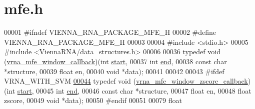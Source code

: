 \hypertarget{mfe_8h_source}{}\section{mfe.\+h}
\label{mfe_8h_source}

\begin{DoxyCode}
00001 \textcolor{preprocessor}{#ifndef VIENNA\_RNA\_PACKAGE\_MFE\_H}
00002 \textcolor{preprocessor}{#define VIENNA\_RNA\_PACKAGE\_MFE\_H}
00003 
00004 \textcolor{preprocessor}{#include <stdio.h>}
00005 \textcolor{preprocessor}{#include <\mbox{\hyperlink{data__structures_8h}{ViennaRNA/data\_structures.h}}>}
00006 
\mbox{\hyperlink{group__mfe__fold_ga4f3e5bc214ef803074ace313cb9571b4}{00036}} \textcolor{keyword}{typedef} void (\mbox{\hyperlink{group__mfe__fold_ga4f3e5bc214ef803074ace313cb9571b4}{vrna\_mfe\_window\_callback}})(\textcolor{keywordtype}{int}         
      \mbox{\hyperlink{special__const_8h_ab53016e6941484f46238d59e2549decb}{start}},
00037                                         \textcolor{keywordtype}{int}         \mbox{\hyperlink{special__const_8h_acc28e141c890270905160748bebdc3ed}{end}},
00038                                         \textcolor{keyword}{const} \textcolor{keywordtype}{char}  *structure,
00039                                         \textcolor{keywordtype}{float}       en,
00040                                         \textcolor{keywordtype}{void}        *data);
00041 
00042 
00043 \textcolor{preprocessor}{#ifdef VRNA\_WITH\_SVM}
\mbox{\hyperlink{mfe_8h_afeb8eb92805a0f0045dc20646ed0255b}{00044}} \textcolor{keyword}{typedef} void (\mbox{\hyperlink{mfe_8h_afeb8eb92805a0f0045dc20646ed0255b}{vrna\_mfe\_window\_zscore\_callback}})(\textcolor{keywordtype}{int}        
      \mbox{\hyperlink{special__const_8h_ab53016e6941484f46238d59e2549decb}{start}},
00045                                                \textcolor{keywordtype}{int}        \mbox{\hyperlink{special__const_8h_acc28e141c890270905160748bebdc3ed}{end}},
00046                                                \textcolor{keyword}{const} \textcolor{keywordtype}{char} *structure,
00047                                                \textcolor{keywordtype}{float}      en,
00048                                                \textcolor{keywordtype}{float}      zscore,
00049                                                \textcolor{keywordtype}{void}       *data);
00050 \textcolor{preprocessor}{#endif}
00051 
00079 \textcolor{keywordtype}{float}

\end{DoxyCode}
